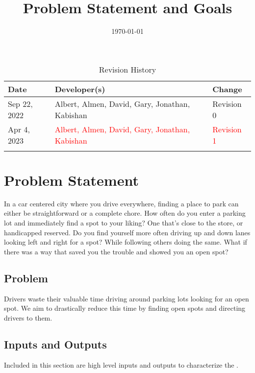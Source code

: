 \documentclass[12pt,letterpaper]{article}
\title{Problem Statement and Goals\\\progname}
\author{\authname}
\date{\today}
\begin{document}
\maketitle

\newpage

\begin{table}[hp]
\caption{Revision History} \label{TblRevisionHistory}
\begin{tabularx}{\textwidth}{lXX}
\toprule
\textbf{Date} & \textbf{Developer(s)} & \textbf{Change}\\
\midrule
Sep 22, 2022 & Albert, Almen, David, Gary, Jonathan, Kabishan & Revision 0\\
\midrule
\color{red}
Apr 4, 2023 & \textcolor{red}{Albert, Almen, David, Gary, Jonathan, Kabishan} &
\textcolor{red}{Revision 1}\\
\bottomrule
\color{black}
\end{tabularx}
\end{table}

\newpage
\tableofcontents
\newpage
\listoftables
\newpage

\section{Problem Statement}

In a car centered city where you drive everywhere, finding a place to park can
either be straightforward or a complete chore. How often do you enter a parking
lot and immediately find a spot to your liking? One that's close to the store,
or handicapped reserved. Do you find yourself more often driving up and down
lanes looking left and right for a spot? While following others doing the same.
What if there was a way that saved you the trouble and showed you an open spot?

\subsection{Problem}
\label{problem}
Drivers waste their valuable time driving around parking lots looking for an
open spot. We aim to drastically reduce this time by finding open spots and
directing drivers to them.

\subsection{Inputs and Outputs}
Included in this section are high level inputs and outputs to characterize the
.
\end{document}
